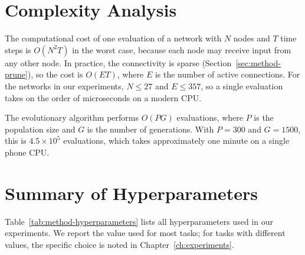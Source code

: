 \section{Complexity Analysis}
\label{sec:method-complexity}

The computational cost of one evaluation of a network with $N$ nodes
and $T$ time steps is $O(N^2 T)$ in the worst case, because each node
may receive input from any other node. In practice, the connectivity is
sparse (Section~\ref{sec:method-prune}), so the cost is $O(ET)$, where
$E$ is the number of active connections. For the networks in our
experiments, $N \leq 27$ and $E \leq 357$, so a single evaluation takes
on the order of microseconds on a modern CPU.

The evolutionary algorithm performs $O(P G)$ evaluations, where $P$ is
the population size and $G$ is the number of generations. With $P = 300$
and $G = 1500$, this is $4.5 \times 10^5$ evaluations, which takes
approximately one minute on a single phone CPU.

\section{Summary of Hyperparameters}
\label{sec:method-hyperparameters}

Table~\ref{tab:method-hyperparameters} lists all hyperparameters used
in our experiments. We report the value used for most tasks; for tasks
with different values, the specific choice is noted in
Chapter~\ref{ch:experiments}.

